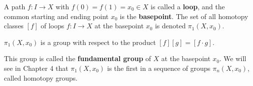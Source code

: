 \begin{definition}
\label{def:loop-and-pi1-set}
A path $f : I \to X$ with $f(0) = f(1) = x_0 \in X$ is called a \textbf{loop}, and the
common starting and ending point $x_0$ is the \textbf{basepoint}. The set of all homotopy
classes $[f]$ of loops $f : I \to X$ at the basepoint $x_0$ is denoted $\pi_1(X,x_0)$.
\end{definition}

\begin{proposition}[$\pi_1(X,x_0)$ is a group]
\label{prop:pi1-is-a-group}
$\pi_1(X,x_0)$ is a group with respect to the product $[f][g] = [f \cdot g]$.
\end{proposition}

This group is called the \textbf{fundamental group} of $X$ at the basepoint $x_0$. We will
see in Chapter 4 that $\pi_1(X,x_0)$ is the first in a sequence of groups $\pi_n(X,x_0)$,
called homotopy groups.


